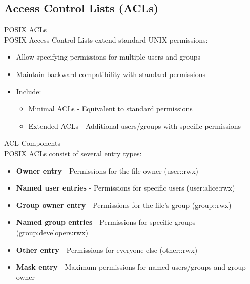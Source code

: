 \subsection{Access Control Lists (ACLs)}

\begin{definition}{POSIX ACLs}\\
POSIX Access Control Lists extend standard UNIX permissions:
\begin{itemize}
    \item Allow specifying permissions for multiple users and groups
    \item Maintain backward compatibility with standard permissions
    \item Include:
    \begin{itemize}
        \item Minimal ACLs - Equivalent to standard permissions
        \item Extended ACLs - Additional users/groups with specific permissions
    \end{itemize}
\end{itemize}
\end{definition}

\begin{concept}{ACL Components}\\
POSIX ACLs consist of several entry types:
\begin{itemize}
    \item \textbf{Owner entry} - Permissions for the file owner (user::rwx)
    \item \textbf{Named user entries} - Permissions for specific users (user:alice:rwx)
    \item \textbf{Group owner entry} - Permissions for the file's group (group::rwx)
    \item \textbf{Named group entries} - Permissions for specific groups (group:developers:rwx)
    \item \textbf{Other entry} - Permissions for everyone else (other::rwx)
    \item \textbf{Mask entry} - Maximum permissions for named users/groups and group owner
\end{itemize}
\end{concept}

